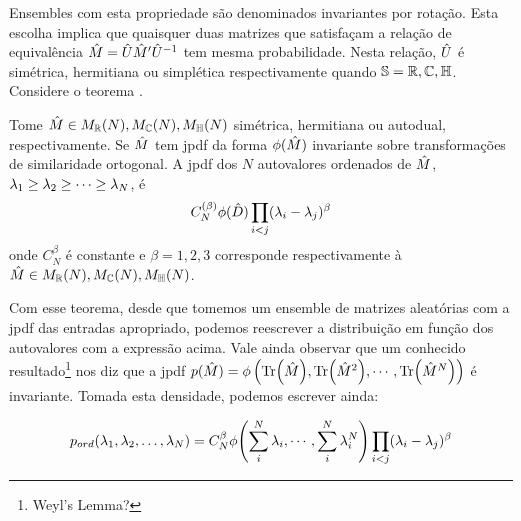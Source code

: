 Ensembles com esta propriedade são denominados invariantes por rotação. Esta escolha implica que quaisquer duas matrizes que satisfaçam a relação de equivalência $\hat M = \hat U \hat M' \hat U^{-1}$ tem mesma probabilidade. Nesta relação, $\hat U$ é simétrica, hermitiana ou simplética respectivamente quando $\mathbb{S} = \mathbb{R},\mathbb{C},\mathbb{H} $. Considere o teorema \cite{AlanThesis}.

\begin{thm}
	Tome $\hat M \in M_{\mathbb{R}}(N),  M_{\mathbb{C}}(N),  M_{\mathbb{H}}(N)$ simétrica, hermitiana ou autodual, respectivamente. Se  $\hat M$ tem jpdf da forma $\phi(\hat M)$ invariante sobre transformações de similaridade ortogonal. A jpdf dos $N$ autovalores ordenados de $\hat M$, $\lambda_1 \geq \lambda_2 \geq \dots \geq \lambda_N$, é $$ C_{N}^{(\beta)} \phi(\hat D) \prod_{i < j} (\lambda_i - \lambda_j)^{\beta}$$ onde $C_{N}^{\beta}$ é constante e $\beta = 1, 2, 3$ corresponde respectivamente à $\hat M \in M_{\mathbb{R}}(N),  M_{\mathbb{C}}(N),  M_{\mathbb{H}}(N)$. 
	\label{Teorema: Invariante}
\end{thm}

Com esse teorema, desde que tomemos um ensemble de matrizes aleatórias com a jpdf das entradas apropriado, podemos reescrever a distribuição em função dos autovalores com a expressão acima. Vale ainda observar que um conhecido resultado\footnote{Weyl's Lemma?} nos diz que a jpdf $p(\hat M)= \phi \left( \Tr(\hat M), \Tr(\hat M^2), \cdots, \Tr(\hat M^N) \right)$ é invariante. Tomada esta densidade, podemos escrever ainda:

\begin{equation}
	p_{ord}(\lambda_1, \lambda_2, \dots, \lambda_N) = C_{N}^{\beta} \phi{\left( \sum_i^N \lambda_i, \cdots, \sum_i^N \lambda_i^N \right)} \prod_{i < j} (\lambda_i - \lambda_j)^{\beta}
	\label{Equation: p-ord}
\end{equation}


